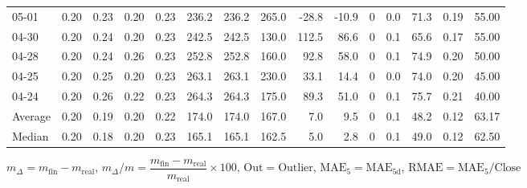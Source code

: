 \begin{threeparttable}
{\begin{tabular}{lrrrrrrrrrrrrrr}
  05-01 &          0.20 &          0.23 &          0.20 &        0.23 &               236.2 &              236.2 &               265.0 &      -28.8 &        -10.9 &              0 &                 0.0 &             71.3 &            0.19 &                  55.00 \\
  04-30 &          0.20 &          0.24 &          0.20 &        0.23 &               242.5 &              242.5 &               130.0 &      112.5 &         86.6 &              0 &                 0.1 &             65.6 &            0.17 &                  55.00 \\
  04-28 &          0.20 &          0.24 &          0.26 &        0.23 &               252.8 &              252.8 &               160.0 &       92.8 &         58.0 &              0 &                 0.1 &             74.9 &            0.20 &                  50.00 \\
  04-25 &          0.20 &          0.25 &          0.20 &        0.23 &               263.1 &              263.1 &               230.0 &       33.1 &         14.4 &              0 &                 0.0 &             74.0 &            0.20 &                  45.00 \\
  04-24 &          0.20 &          0.26 &          0.22 &        0.23 &               264.3 &              264.3 &               175.0 &       89.3 &         51.0 &              0 &                 0.1 &             75.7 &            0.21 &                  40.00 \\
Average &          0.20 &          0.19 &          0.20 &        0.22 &               174.0 &              174.0 &               167.0 &        7.0 &          9.5 &              0 &                 0.1 &             48.2 &            0.12 &                  63.17 \\
 Median &          0.20 &          0.18 &          0.20 &        0.23 &               165.1 &              165.1 &               162.5 &        5.0 &          2.8 &              0 &                 0.1 &             49.0 &            0.12 &                  62.50 \\
\bottomrule
\end{tabular}
}
\begin{tablenotes}\footnotesize
\item $m_\Delta=m_{\text{fin}}-m_{\text{real}}$,
$m_\Delta/m=\dfrac{m_{\text{fin}}-m_{\text{real}}}{m_{\text{real}}}\times100$,
$\mathrm{Out}=\text{Outlier}$,
$\mathrm{MAE}_5=\mathrm{MAE}_{5\text{d}}$,
$\mathrm{RMAE}=\mathrm{MAE}_5/\text{Close}$
\end{tablenotes}
\end{threeparttable}
\endgroup

